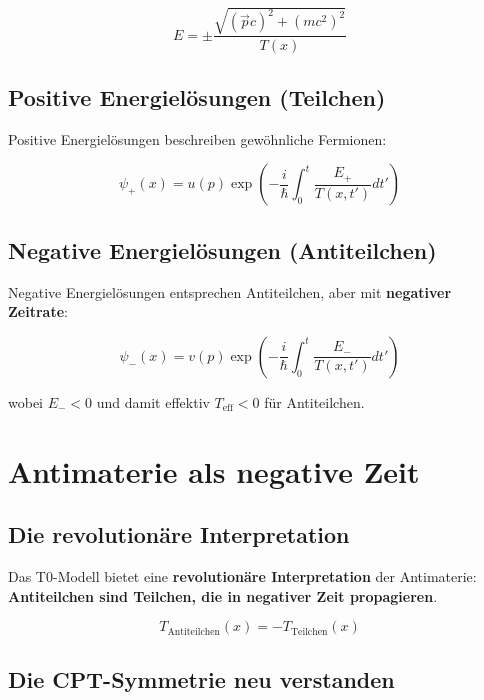 \documentclass[12pt,a4paper]{report}
\begin{document}
\begin{equation}
	E = \pm\frac{\sqrt{(\vec{p}c)^2 + (mc^2)^2}}{T(x)}
\end{equation}

\subsection{Positive Energielösungen (Teilchen)}

Positive Energielösungen beschreiben gewöhnliche Fermionen:

\begin{equation}
	\psi_+(x) = u(p) \exp\left(-\frac{i}{\hbar}\int_0^t \frac{E_+}{T(x,t')} dt'\right)
\end{equation}

\subsection{Negative Energielösungen (Antiteilchen)}

Negative Energielösungen entsprechen Antiteilchen, aber mit \textbf{negativer Zeitrate}:

\begin{equation}
	\psi_-(x) = v(p) \exp\left(-\frac{i}{\hbar}\int_0^t \frac{E_-}{T(x,t')} dt'\right)
\end{equation}

wobei $E_- < 0$ und damit effektiv $T_{\text{eff}} < 0$ für Antiteilchen.

\section{Antimaterie als negative Zeit}

\subsection{Die revolutionäre Interpretation}

Das T0-Modell bietet eine \textbf{revolutionäre Interpretation} der Antimaterie: \textbf{Antiteilchen sind Teilchen, die in negativer Zeit propagieren}.

\begin{equation}
	T_{\text{Antiteilchen}}(x) = -T_{\text{Teilchen}}(x)
\end{equation}

\subsection{Die CPT-Symmetrie neu verstanden}
\end{document}
